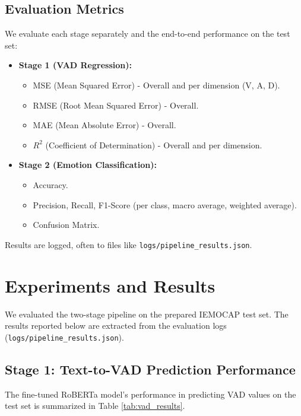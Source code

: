 \documentclass[conference]{IEEEtran}
\begin{document}
\subsection{Evaluation Metrics}
We evaluate each stage separately and the end-to-end performance on the test set:
\begin{itemize}
    \item \textbf{Stage 1 (VAD Regression):}
        \begin{itemize}
            \item MSE (Mean Squared Error) - Overall and per dimension (V, A, D).
            \item RMSE (Root Mean Squared Error) - Overall.
            \item MAE (Mean Absolute Error) - Overall.
            \item $R^2$ (Coefficient of Determination) - Overall and per dimension.
        \end{itemize}
    \item \textbf{Stage 2 (Emotion Classification):}
        \begin{itemize}
            \item Accuracy.
            \item Precision, Recall, F1-Score (per class, macro average, weighted average).
            \item Confusion Matrix.
        \end{itemize}
\end{itemize}
Results are logged, often to files like \texttt{logs/pipeline\_results.json}.

\section{Experiments and Results}
We evaluated the two-stage pipeline on the prepared IEMOCAP test set. The results reported below are extracted from the evaluation logs (\texttt{logs/pipeline\_results.json}).

\subsection{Stage 1: Text-to-VAD Prediction Performance}
The fine-tuned RoBERTa model's performance in predicting VAD values on the test set is summarized in Table \ref{tab:vad_results}.
\end{document}
